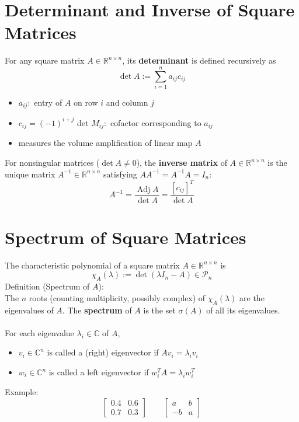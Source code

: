 \documentclass[10pt,a4paper,oneside]{article}
\begin{document}
\section{Determinant and Inverse of Square Matrices}
For any square matrix $A\in\mathbb{R}^{n\times n}$, its {\bfseries determinant} is defined recursively as
\[
\operatorname{det} A :=\sum_{i=1}^{n} a_{i j} c_{i j}
\]
\begin{itemize}
\item $a_{i j} :$ entry of $A$ on row $i$ and column $j$
\item $c_{i j}=(-1)^{i+j}$ det $M_{i j} :$ cofactor corresponding to $a_{i j}$
\item measures the volume amplification of linear map $A$
\end{itemize}
For nonsingular matrices ($\det A\neq0$), the {\bfseries inverse matrix} of $A\in\mathbb{R}^{n\times n}$ is the unique matrix $A^{-1}\in\mathbb{R}^{n\times n}$ satisfying $AA^{-1}=A^{-1}A=I_n$:
\[
A^{-1}=\frac{\operatorname{Adj} A}{\operatorname{det} A}=\frac{\left[c_{i j}\right]^{T}}{\operatorname{det} A}
\]
\section{Spectrum of Square Matrices}
The characteristic polynomial of a square matrix $A \in \mathbb{R}^{n \times n}$ is
\[
\chi_{A}(\lambda) :=\operatorname{det}\left(\lambda I_{n}-A\right) \in \mathcal{P}_{n}
\]
Definition (Spectrum of $A$):\\
The $n$ roots (counting multiplicity, possibly complex) of $\chi_{A}(\lambda)$ are the eigenvalues of $A$. The {\bfseries spectrum} of $A$ is the set $\sigma(A)$ of all its eigenvalues.\\
\\
For each eigenvalue $\lambda_i\in\mathbb{C}$ of $A$,
\begin{itemize}
\item $v_{i} \in \mathbb{C}^{n}$ is called a (right) eigenvector if $A v_{i}=\lambda_{i} v_{i}$
\item $w_{i} \in \mathbb{C}^{n}$ is called a left eigenvector if $w_{i}^{T} A=\lambda_{i} w_{i}^{T}$
\end{itemize}
Example:
\[
\left[\begin{array}{cc}{0.4} & {0.6} \\ {0.7} & {0.3}\end{array}\right] \qquad\left[\begin{array}{cc}{a} & {b} \\ {-b} & {a}\end{array}\right]
\]
\end{document}
